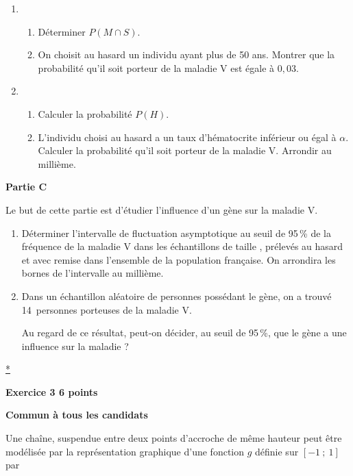 \documentclass[10pt]{article}
\begin{document}
\begin{enumerate}
\item 
	\begin{enumerate}
		\item Déterminer $P(M \cap S)$. 
		\item On choisit au hasard un individu ayant plus de 50 ans. Montrer que la probabilité qu'il soit porteur de la maladie V est égale à $0,03$.
	\end{enumerate} 
\item
	\begin{enumerate}
		\item Calculer la probabilité $P(H)$. 
		\item L'individu choisi au hasard a un taux d'hématocrite inférieur ou égal à $\alpha$. Calculer la probabilité qu'il soit porteur de la maladie V. Arrondir au millième. 
	\end{enumerate}
\end{enumerate}

\bigskip

\textbf{Partie C}

\medskip
	
Le but de cette partie est d'étudier  l'influence d'un gène sur la maladie V. 

\medskip

\begin{enumerate}
\item Déterminer l'intervalle de fluctuation asymptotique au seuil de 95\,\% de la fréquence de la maladie V dans les échantillons de taille , prélevés au hasard et avec remise dans l'ensemble de la population française. On arrondira les bornes de l'intervalle au millième.
\item Dans un échantillon aléatoire de  personnes possédant le gène, on a trouvé 14~personnes porteuses de la maladie V.

Au regard de ce résultat, peut-on décider, au seuil de 95\,\%, que le gène a une influence sur la maladie ?
\end{enumerate}

\hyperlink{Index}{*}

\vspace{0,5cm}

\textbf{Exercice 3 \hfill 6 points}

\textbf{Commun à tous les candidats}

\medskip

Une chaîne, suspendue entre deux points d'accroche de même hauteur peut être modélisée par la représentation graphique d'une fonction $g$ définie sur $[-1~;~1]$ par 
\end{document}
